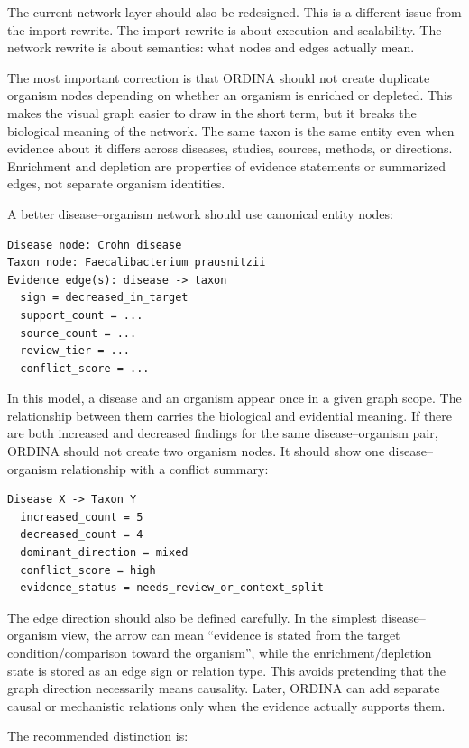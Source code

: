 \documentclass[11pt,a4paper]{article}
\begin{document}
The current network layer should also be redesigned. This is a different issue from the import rewrite. The import rewrite is about execution and scalability. The network rewrite is about semantics: what nodes and edges actually mean.

The most important correction is that ORDINA should not create duplicate organism nodes depending on whether an organism is enriched or depleted. This makes the visual graph easier to draw in the short term, but it breaks the biological meaning of the network. The same taxon is the same entity even when evidence about it differs across diseases, studies, sources, methods, or directions. Enrichment and depletion are properties of evidence statements or summarized edges, not separate organism identities.

A better disease--organism network should use canonical entity nodes:

\begin{verbatim}
Disease node: Crohn disease
Taxon node: Faecalibacterium prausnitzii
Evidence edge(s): disease -> taxon
  sign = decreased_in_target
  support_count = ...
  source_count = ...
  review_tier = ...
  conflict_score = ...
\end{verbatim}

In this model, a disease and an organism appear once in a given graph scope. The relationship between them carries the biological and evidential meaning. If there are both increased and decreased findings for the same disease--organism pair, ORDINA should not create two organism nodes. It should show one disease--organism relationship with a conflict summary:

\begin{verbatim}
Disease X -> Taxon Y
  increased_count = 5
  decreased_count = 4
  dominant_direction = mixed
  conflict_score = high
  evidence_status = needs_review_or_context_split
\end{verbatim}

The edge direction should also be defined carefully. In the simplest disease--organism view, the arrow can mean ``evidence is stated from the target condition/comparison toward the organism'', while the enrichment/depletion state is stored as an edge sign or relation type. This avoids pretending that the graph direction necessarily means causality. Later, ORDINA can add separate causal or mechanistic relations only when the evidence actually supports them.

The recommended distinction is:
\end{document}
